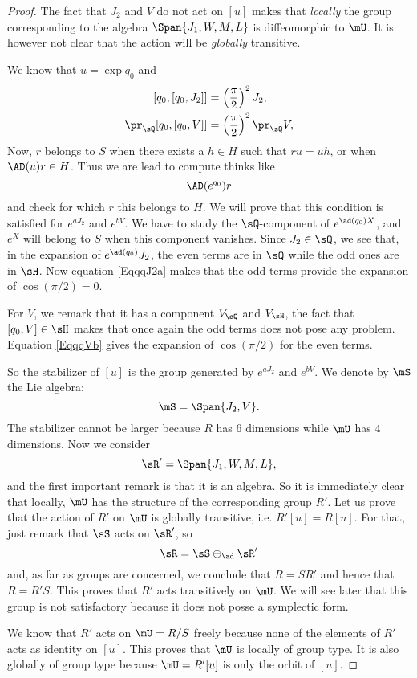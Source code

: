 \begin{proof}
	The fact that $J_{2}$ and $V$ do not act on $[u]$ makes that \emph{locally} the group corresponding to the algebra $\Span\{ J_{1},W,M,L \}$ is diffeomorphic to $\mU$. It is however not clear that the action will be \emph{globally} transitive.

	We know that $u=\exp q_0$ and
	\begin{subequations}
		\begin{align}
			[q_0,[q_0,J_{2}]]      & =\left( \frac{ \pi }{2} \right)^{2}J_{2},         \label{EqqqJ2a}   \\
			\pr_{\sQ}[q_0,[q_0,V]] & =\left( \frac{ \pi }{2} \right)^{2}\pr_{\sQ}V,       \label{EqqqVb}
		\end{align}
	\end{subequations}
	Now, $r$ belongs to $S$ when there exists a $h\in H$ such that $ru=uh$, or when $\AD(u)r\in H$. Thus we are lead to compute thinks like
	\[
		\AD( e^{q_0})r
	\]
	and check for which $r$ this belongs to $H$. We will prove that this condition is satisfied for $ e^{aJ_{2}}$ and $ e^{bV}$. We have to study the $\sQ$-component of $ e^{\ad(q_0)X}$, and $ e^{X}$ will belong to $S$ when this component vanishes. Since $J_2\in\sQ$, we see that, in the expansion of $ e^{\ad(q_0)}J_2$, the even terms are in $\sQ$ while the odd ones are in $\sH$. Now equation \eqref{EqqqJ2a} makes that the odd terms provide the expansion of $\cos(\pi/2)=0$.

	For $V$, we remark that it has a component $V_{\sQ}$ and $V_{\sH}$, the fact that $[q_0,V]\in\sH$ makes that once again the odd terms does not pose any problem. Equation \eqref{EqqqVb} gives the expansion of $\cos(\pi/2)$ for the even terms.

	So the stabilizer of $[u]$ is the group generated by $ e^{aJ_2}$ and $ e^{bV}$. We denote by $\mS$ the Lie algebra:
	\[
		\mS=\Span\{ J_2,V \}.
	\]
	The stabilizer cannot be larger because $R$ has $6$ dimensions while $\mU$ has $4$ dimensions. Now we consider
	\[
		\sR'=\Span\{ J_1,W,M,L \},
	\]
	and the first important remark is that it is an algebra. So it is immediately clear that locally, $\mU$ has the structure of the corresponding group $R'$. Let us prove that the action of $R'$ on $\mU$ is globally transitive, i.e. $R'[u]=R[u]$. For that, just remark that $\sS$ acts on $\sR'$, so
	\[
		\sR=\sS\oplus_{\ad}\sR'
	\]
	and, as far as groups are concerned, we conclude that $R=SR'$ and hence that $R=R'S$. This proves that $R'$ acts transitively on $\mU$. We will see later that this group is not satisfactory because it does not posse a symplectic form.

	We know that $R'$ acts on $\mU=R/S$ freely because none of the elements of $R'$ acts as identity on $[u]$. This proves that $\mU$ is locally of group type. It is also globally of group type because $\mU=R'[u]$ is only the orbit of $[u]$.

\end{proof}

